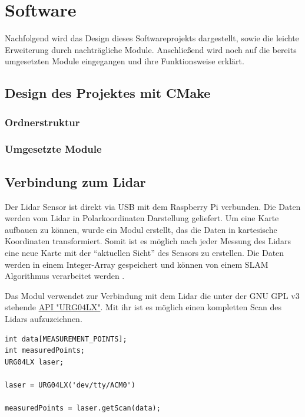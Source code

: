 

\chapter{Software}
Nachfolgend wird das Design dieses Softwareprojekts dargestellt, sowie die leichte Erweiterung durch nachträgliche Module. Anschließend wird noch auf die bereits umgesetzten Module eingegangen und ihre Funktionsweise erklärt. 

\section{Design des Projektes mit CMake}


\subsection{Ordnerstruktur}

\subsection{Umgesetzte Module}







\section{Verbindung zum Lidar}

Der Lidar Sensor ist direkt via USB mit dem Raspberry Pi verbunden. Die Daten werden vom Lidar in Polarkoordinaten Darstellung geliefert. Um eine Karte aufbauen zu können, wurde ein Modul erstellt, das die Daten in kartesische Koordinaten transformiert. Somit ist es möglich nach jeder Messung des Lidars eine neue Karte mit der "`aktuellen Sicht"' des Sensors zu erstellen. Die Daten werden in einem Integer-Array gespeichert und können von einem SLAM Algorithmus verarbeitet werden . 

Das Modul verwendet zur Verbindung mit dem Lidar die unter der GNU GPL v3 stehende \href{https://github.com/simondlevy/BreezyLidar}{API "URG04LX"}. Mit ihr ist es möglich einen kompletten Scan des Lidars aufzuzeichnen. 
\vspace{0.4cm}

\begin{lstlisting}
int data[MEASUREMENT_POINTS]; 
int measuredPoints;
URG04LX laser;

laser = URG04LX('dev/tty/ACM0')

measuredPoints = laser.getScan(data);

\end{lstlisting}
\vspace{-0.6cm}

